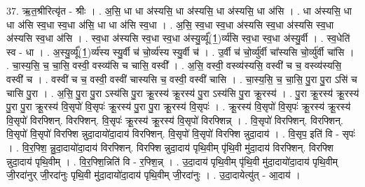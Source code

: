 \documentclass[17pt]{extarticle}
\begin{document}
37. ऋ॒त॒श्रीरित्यृ॑त - श्रीः । . अ॒सि॒ धा धा अ॑स्यसि॒ धा अ॑स्यसि॒ धा अ॑स्यसि॒ धा अ॑सि । . धा अ॑स्यसि॒ धा धा अ॑सि स्व॒धा स्व॒धा अ॑सि॒ धा धा अ॑सि स्व॒धा । . अ॒सि॒ स्व॒धा स्व॒धा अ॑स्यसि स्व॒धा अ॑स्यसि स्व॒धा अ॑स्यसि स्व॒धा अ॑सि । . स्व॒धा अ॑स्यसि स्व॒धा स्व॒धा अ॑स्यु॒र्व्यू᳚(1॒)र्व्य॑सि स्व॒धा स्व॒धा अ॑स्यु॒र्वी । . स्व॒धेति॑ स्व - धा । . अ॒स्यु॒र्व्यू᳚(1॒)र्व्य॑स्य स्यु॒र्वी च॑ चो॒र्व्य॑स्य स्यु॒र्वी च॑ । . उ॒र्वी च॑ चो॒र्व्यु॑र्वी चा᳚स्यसि चो॒र्व्यु॑र्वी चा॑सि । . चा॒स्य॒सि॒ च॒ चा॒सि॒ वस्वी॒ वस्व्य॑सि च चासि॒ वस्वी᳚ । . अ॒सि॒ वस्वी॒ वस्व्य॑स्यसि॒ वस्वी॑ च च॒ वस्व्य॑स्यसि॒ वस्वी॑ च । . वस्वी॑ च च॒ वस्वी॒ वस्वी॑ चास्यसि च॒ वस्वी॒ वस्वी॑ चासि । . चा॒स्य॒सि॒ च॒ चा॒सि॒ पु॒रा पु॒रा ऽसि॑ च चासि पु॒रा । . अ॒सि॒ पु॒रा पु॒रा ऽस्य॑सि पु॒रा क्रू॒रस्य॑ क्रू॒रस्य॑ पु॒रा ऽस्य॑सि पु॒रा क्रू॒रस्य॑ । . पु॒रा क्रू॒रस्य॑ क्रू॒रस्य॑ पु॒रा पु॒रा क्रू॒रस्य॑ वि॒सृपो॑ वि॒सृपः॑ क्रू॒रस्य॑ पु॒रा पु॒रा क्रू॒रस्य॑ वि॒सृपः॑ । . क्रू॒रस्य॑ वि॒सृपो॑ वि॒सृपः॑ क्रू॒रस्य॑ क्रू॒रस्य॑ वि॒सृपो॑ विरफ्शिन्. विरफ्शिन्. वि॒सृपः॑ क्रू॒रस्य॑ क्रू॒रस्य॑ वि॒सृपो॑ विरफ्शिन्न् । . वि॒सृपो॑ विरफ्शिन्. विरफ्शिन्. वि॒सृपो॑ वि॒सृपो॑ विरफ्शि न्नुदा॒दायो॑दा॒दाय॑ विरफ्शिन्. वि॒सृपो॑ वि॒सृपो॑ 
विरफ्शि न्नुदा॒दाय॑ । . वि॒सृप॒ इति॑ वि - सृपः॑ । . वि॒र॒फ्शि॒ न्नु॒दा॒दायो॑दा॒दाय॑ विरफ्शिन्. विरफ्शि न्नुदा॒दाय॑ पृथि॒वीम् पृ॑थि॒वी मु॑दा॒दाय॑ विरफ्शिन्. विरफ्शि न्नुदा॒दाय॑ पृथि॒वीम् । . वि॒र॒फ्शि॒न्निति॑ वि - र॒फ्शि॒न्न् । . उ॒दा॒दाय॑ पृथि॒वीम् पृ॑थि॒वी मु॑दा॒दायो॑दा॒दाय॑ पृथि॒वीम् जी॒रदा॑नुर् जी॒रदा॑नुः पृथि॒वी मु॑दा॒दायो॑दा॒दाय॑ पृथि॒वीम् जी॒रदा॑नुः । . उ॒दा॒दायेत्यु॑त् - आ॒दाय॑ । \newline
\end{document}
